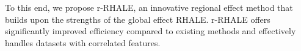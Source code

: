 \documentclass[sigconf, nonacm]{acmart}
\begin{document}
To this end, we propose r-RHALE, an innovative regional effect method that builds upon the strengths of the global effect RHALE. r-RHALE offers significantly improved efficiency compared to existing methods and effectively handles datasets with correlated features.








\end{document}
